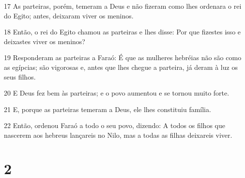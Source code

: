 \par 17 As parteiras, porém, temeram a Deus e não fizeram como lhes ordenara o rei do Egito; antes, deixaram viver os meninos.
\par 18 Então, o rei do Egito chamou as parteiras e lhes disse: Por que fizestes isso e deixastes viver os meninos?
\par 19 Responderam as parteiras a Faraó: É que as mulheres hebréias não são como as egípcias; são vigorosas e, antes que lhes chegue a parteira, já deram à luz os seus filhos.
\par 20 E Deus fez bem às parteiras; e o povo aumentou e se tornou muito forte.
\par 21 E, porque as parteiras temeram a Deus, ele lhes constituiu família.
\par 22 Então, ordenou Faraó a todo o seu povo, dizendo: A todos os filhos que nascerem aos hebreus lançareis no Nilo, mas a todas as filhas deixareis viver.

\chapter{2}

